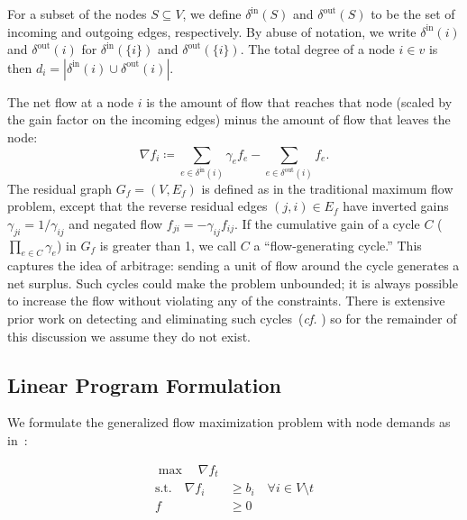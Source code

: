 \documentclass[11pt]{article}
\theoremstyle{definition}
\theoremstyle{definition}
\theoremstyle{definition}
\newcommand{\nfi}{\nabla f_i}
\newcommand{\din}{\delta^{\text{in}}}
\newcommand{\dout}{\delta^{\text{out}}}
\newcommand{\rewrite}[1]{\textcolor{red}{#1}}
\newif\ifLAYOUTA
\begin{document}
	For a subset of the nodes $S \subseteq V$, we define $\din(S)$ and
	$\dout(S)$ to be the set of incoming and outgoing edges, respectively. By
    abuse of notation, we write $\din(i)$ and $\dout(i)$ for $\din(\{i\})$ and $\dout(\{i\})$.
	The total degree of a node $i \in v$ is then $d_i = |\din(i) \cup \dout(i)|$.

	The net flow at a node $i$ is the amount of flow that
	reaches that node (scaled by the gain factor on the incoming edges) minus the
	amount of flow that leaves the node:
	$$ \nfi \coloneqq \sum_{e \in \din(i)} \gamma_e f_e - \sum_{e \in \dout(i)} f_e.$$
	The residual graph $G_f = (V,E_f)$ is defined as in the traditional maximum flow problem,
	except that the reverse residual edges $(j,i) \in E_f$ have inverted gains 
	$\gamma_{ji} = 1 / \gamma_{ij}$ and negated flow $f_{ji} =
	-\gamma_{ij}f_{ij}$. If the cumulative gain of a cycle $C$ ($\prod_{e \in C} \gamma_e$)
	in $G_f$ is greater than 1, we call $C$ a ``flow-generating cycle.'' 
	This captures the idea of arbitrage: sending a unit of flow around the cycle
	generates a net surplus. Such cycles could make the problem unbounded;
	it is always possible to increase the flow without violating any of the
	constraints. There is extensive prior work on detecting and eliminating such
	cycles~(\emph{cf.} \cite{Vegh2013})
    so for the remainder of this discussion we assume they do not exist.

	\subsection{Linear Program Formulation}
	\label{sec:lp}

	We formulate the generalized flow maximization problem with node demands as in~\cite{Olver2017}:
	\ifLAYOUTA
	\else
	\vspace{-0.5cm}
	\fi
%
%

	\begin{align*}\tag{P}\label{eqn:primal}
    \max \quad \nabla f_t& \\
    \text{s.t.} \quad
    \nabla f_i &\geq b_i \quad \forall i \in V \setminus t \\
    f &\geq 0
    \end{align*}
\end{document}
